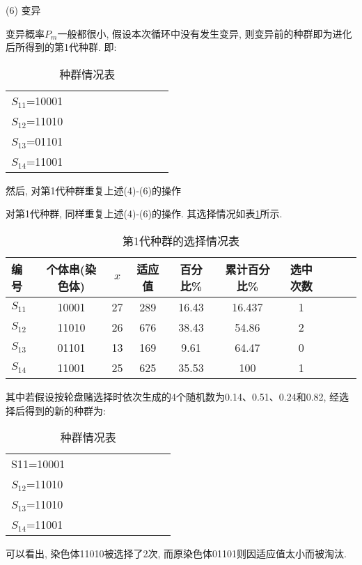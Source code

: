 { (6) 变异

变异概率$P_m$一般都很小, 假设本次循环中没有发生变异, 则变异前的种群即为进化后所得到的第1代种群. 即:

\begin{table} [H]
\caption{种群情况表}
\begin{center}
\begin{tabular} {lccccccccc}
\hline
    $S_{11}$=10001\\
    $S_{12}$=11010\\
    $S_{13}$=01101\\
    $S_{14}$=11001\\
\hline
\end{tabular}
\end{center}
\end{table}

然后, 对第1代种群重复上述(4)-(6)的操作

对第1代种群, 同样重复上述(4)-(6)的操作. 其选择情况如表\ref{AI_table2019112807}所示.
\begin{table} [H]
\caption{第1代种群的选择情况表}
\begin{center}
\begin{tabular} {lccccccccc}
  \hline
编号	&个体串(染色体)&	 $x$	&适应值	&百分比\%	&累计百分比\%	&选中次数\\
  \hline
$S_{11}$	&10001	&27	&289	&16.43	&16.437	&1\\
$S_{12}$&	11010	&26	&676&38.43	&54.86	&2\\
$S_{13}$&	01101	&13	&169	&9.61	&64.47	&0\\
$S_{14}$	&11001	&25	&625	&35.53	&100	&1\\
\hline
\end{tabular}
\end{center}
\label{AI_table2019112807}
\end{table}
其中若假设按轮盘赌选择时依次生成的4个随机数为0.14、0.51、0.24和0.82, 经选择后得到的新的种群为:
\begin{table} [H]
\caption{种群情况表}
\begin{center}
\begin{tabular} {lccccccccc}
\hline
S11=10001\\
    $S_{12}$=11010\\
    $S_{13}$=11010\\
    $S_{14}$=11001\\
\hline
\end{tabular}
\end{center}
\end{table}
可以看出, 染色体11010被选择了2次, 而原染色体01101则因适应值太小而被淘汰.

}
